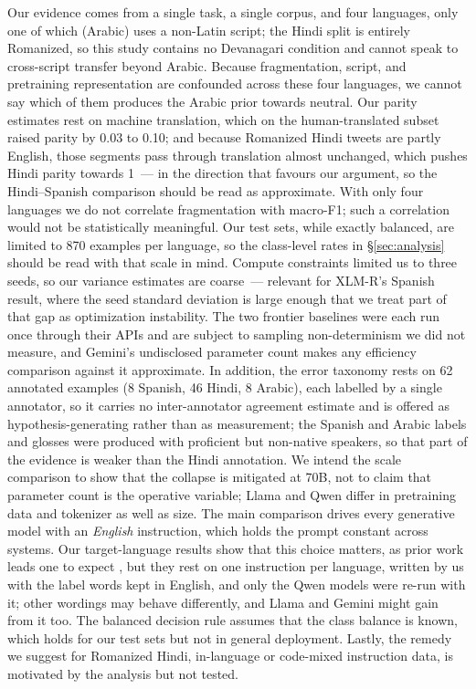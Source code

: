\documentclass[11pt]{article}
\begin{document}
Our evidence comes from a single task, a single corpus, and four languages, only
one of which (Arabic) uses a non-Latin script; the Hindi split is entirely
Romanized, so this study contains no Devanagari condition and cannot speak to
cross-script transfer beyond Arabic. Because fragmentation, script, and
pretraining representation are confounded across these four languages, we cannot
say which of them produces the Arabic prior towards neutral. Our parity estimates rest on machine
translation, which on the human-translated subset raised parity by 0.03 to 0.10;
and because Romanized Hindi tweets are partly English, those segments pass through
translation almost unchanged, which pushes Hindi parity towards 1~--- in the
direction that favours our argument, so the Hindi--Spanish comparison should be read
as approximate. With only four languages we do not correlate fragmentation with
macro-F1; such a correlation would not be statistically meaningful. Our test sets, while exactly balanced, are limited to 870 examples
per language, so the class-level rates in \S\ref{sec:analysis} should be read with
that scale in mind. Compute
constraints limited us to three seeds, so our variance estimates are coarse~---
relevant for \mbox{XLM-R}'s Spanish result, where the seed standard deviation is large
enough that we treat part of that gap as optimization instability. The two
frontier baselines were each run once through their APIs and are subject to
sampling non-determinism we did not measure, and Gemini's undisclosed parameter
count makes any efficiency comparison against it approximate. In addition, the error
taxonomy rests on 62 annotated examples (8 Spanish, 46 Hindi, 8 Arabic), each
labelled by a single annotator, so it
carries no inter-annotator agreement estimate and is offered as
hypothesis-generating rather than as measurement; the Spanish and Arabic labels
and glosses were produced with proficient but non-native speakers, so that part of
the evidence is weaker than the Hindi annotation. We intend the scale comparison
to show that the collapse is mitigated at 70B, not to claim that parameter count
is the operative variable; Llama and Qwen differ in pretraining data and tokenizer
as well as size. The main comparison drives every generative model with an
\emph{English} instruction, which holds the prompt constant across systems. Our
target-language results show that this choice matters, as prior work leads one to
expect \citep{etxaniz2024think}, but they rest on one instruction per language,
written by us with the label words kept in English, and only the Qwen models were
re-run with it; other wordings may behave differently, and Llama and Gemini might
gain from it too. The balanced decision rule assumes that the class balance is
known, which holds for our test sets but not in general deployment. Lastly, the
remedy we suggest for Romanized Hindi, in-language or code-mixed instruction data,
is motivated by the analysis but not tested.
\end{document}
